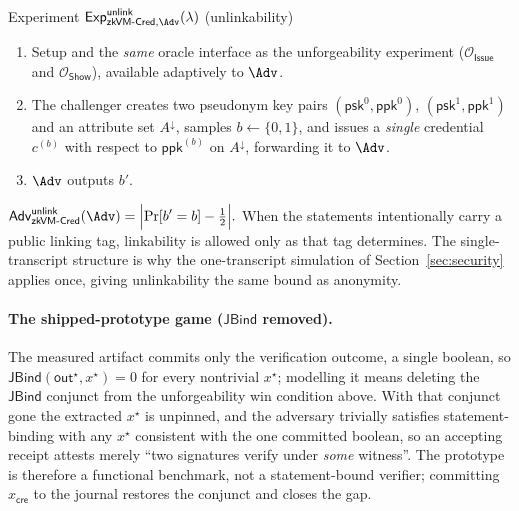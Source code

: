 \begin{gamebox}{Experiment $\mathsf{Exp}^{\mathsf{unlink}}_{\mathsf{zkVM\text{-}Cred},\Adv}(\lambda)$ (unlinkability)}
\begin{enumerate}
\item Setup and the \emph{same} oracle interface as the unforgeability experiment
($\mathcal O_{\mathsf{Issue}}$ and $\mathcal O_{\mathsf{Show}}$), available adaptively to $\Adv$.
\item The challenger creates two pseudonym key pairs $(\mathsf{psk}^0,\mathsf{ppk}^0)$,
$(\mathsf{psk}^1,\mathsf{ppk}^1)$ and an attribute set $A^\downarrow$, samples $b\leftarrow\{0,1\}$, and
issues a \emph{single} credential $c^{(b)}$ with respect to $\mathsf{ppk}^{(b)}$ on $A^\downarrow$,
forwarding it to $\Adv$.
\item $\Adv$ outputs $b'$.
\end{enumerate}
$\displaystyle
\mathsf{Adv}^{\mathsf{unlink}}_{\mathsf{zkVM\text{-}Cred}}(\Adv)
=\Bigl|\Pr[b'=b]-\tfrac12\Bigr|.$
When the statements intentionally carry a public linking tag, linkability is allowed only as that tag
determines. The single-transcript structure is why the one-transcript simulation of
Section~\ref{sec:security} applies once, giving unlinkability the same bound as anonymity.
\end{gamebox}

\paragraph{The shipped-prototype game ($\mathsf{JBind}$ removed).}
The measured artifact commits only the verification outcome, a single boolean, so
$\mathsf{JBind}(\mathsf{out}^\star,x^\star)=0$ for every nontrivial $x^\star$; modelling it means
deleting the $\mathsf{JBind}$ conjunct from the unforgeability win condition above. With that conjunct
gone the extracted $x^\star$ is unpinned, and the adversary trivially satisfies statement-binding with
any $x^\star$ consistent with the one committed boolean, so an accepting receipt attests merely
``two signatures verify under \emph{some} witness''. The prototype is therefore a functional benchmark,
not a statement-bound verifier; committing $x_{\mathsf{cre}}$ to the journal restores the conjunct and
closes the gap.



